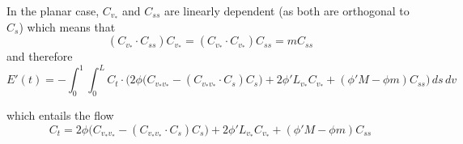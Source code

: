 \documentclass[twoside,a4paper,english]{article}
\def\v{{v_*}}
\begin{document}
In the planar case, $C_{\v}$ and $C_{ss}$ are linearly dependent
(as both are orthogonal to $C_s$) which means that
\begin{equation}
  (C_{\v}\cdot C_{ss})C_{\v}=(C_{\v}\cdot C_{\v})C_{ss}=mC_{ss}
\end{equation}
and therefore
\begin{equation}
E'(t)=
  -\int_0^1\int_0^L
    C_t\cdot\Big(
      2\phi\big(C_{\v\v}-(C_{\v\v}\cdot C_s)C_s\big)
     +2\phi'L_{\v} C_{\v}
     +(\phi'M-\phi m)C_{ss}
    \Big)
  \,ds\,dv
\end{equation}

which entails the flow
\[ C_t =  
      2\phi\big(C_{\v\v}-(C_{\v\v}\cdot C_s)C_s\big)
     +2\phi'L_{\v} C_{\v}
     +(\phi'M-\phi m)C_{ss}
 \]




\newpage

\tableofcontents 

\bigskip

\listoffigures

\bigskip
\end{document}
